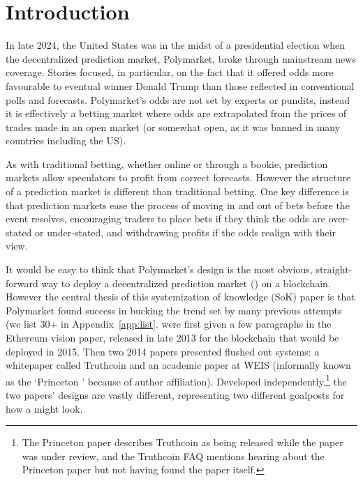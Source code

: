 \section{Introduction}

In late 2024, the United States was in the midst of a presidential election when the decentralized prediction market, Polymarket, broke through mainstream news coverage. Stories focused, in particular, on the fact that it offered odds more favourable to eventual winner Donald Trump than those reflected in conventional polls and forecasts. Polymarket's odds are not set by experts or pundits, instead it is effectively a betting market where odds are extrapolated from the prices of trades made in an open market (or somewhat open, as it was banned in many countries including the US). 

As with traditional betting, whether online or through a bookie, prediction markets allow speculators to profit from correct forecasts. However the structure of a prediction market is different than traditional betting. One key difference is that prediction markets ease the process of moving in and out of bets before the event resolves, encouraging traders to place bets if they think the odds are over-stated or under-stated, and withdrawing profits if the odds realign with their view. 

It would be easy to think that Polymarket's design is the most obvious, straight-forward way to deploy a decentralized prediction market (\depm) on a blockchain. However the central thesis of this systemization of knowledge (SoK) paper is that Polymarket found success in bucking the trend set by many previous attempts (we list 30+ \depms in Appendix~\ref{app:list}. \depms were first given a few paragraphs in the Ethereum vision paper, released in late 2013 for the blockchain that would be deployed in 2015. Then two 2014 papers presented flushed out systems: a whitepaper called Truthcoin and an academic paper at WEIS (informally known as the `Princeton \depm' because of author affiliation). Developed independently,\footnote{The Princeton paper describes Truthcoin as being released while the paper was under review, and the Truthcoin FAQ mentions hearing about the Princeton paper but not having found the paper itself.} the two papers' designs are vastly different, representing two different goalposts for how a \depm might look. 

